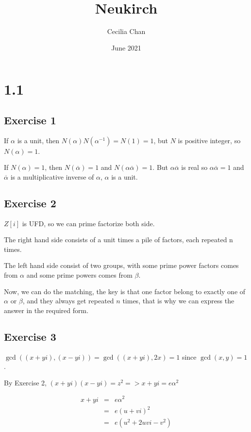 \documentclass{article}
\title{Neukirch}
\author{Cecilia Chan}
\date{June 2021}
\begin{document}
\maketitle

\section{1.1}
\subsection{Exercise 1}
If $ \alpha $ is a unit, then $ N(\alpha) N(\alpha^{-1}) = N(1) = 1 $, but $ N $ is positive integer, so $ N(\alpha) = 1 $.

If $ N(\alpha) = 1 $, then $ N(\overline{\alpha}) = 1 $ and $ N(\alpha \overline{\alpha}) = 1 $. But $ \alpha \overline{\alpha}$ is real so $ \alpha \overline{\alpha} = 1 $ and $ \overline{\alpha} $ is a multiplicative inverse of $ \alpha $, $ \alpha $ is a unit.

\subsection{Exercise 2}
$ Z[i] $ is UFD, so we can prime factorize both side.

The right hand side consists of a unit times a pile of factors, each repeated n times.

The left hand side consist of two groups, with some prime power factors comes from $ \alpha $ and some prime powers comes from $ \beta $.

Now, we can do the matching, the key is that one factor belong to exactly one of $ \alpha $ or $ \beta $, and they always get repeated $ n $ times, that is why we can express the answer in the required form.

\subsection{Exercise 3}

$ \gcd((x + yi), (x - yi)) = \gcd((x + yi), 2x) = 1 $ since $ \gcd(x, y) = 1 $.

By Exercise 2, $ (x + yi)(x - yi) = z^2 => x + yi = e \alpha^2 $

\begin{eqnarray*}
  x + yi &=& e \alpha^2   \\
         &=& e (u + vi)^2 \\
         &=& e (u^2 + 2uvi -v^2)
\end{eqnarray*}
\end{document}
